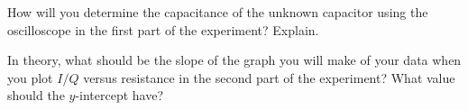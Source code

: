 \documentclass[addpoints]{physlabs}
\date{\today}
\begin{document}
\maketitle

\begin{prelab}

    \filbreak
    \question[1] How will you determine the capacitance of the unknown capacitor using the oscilloscope in the first part of the experiment? Explain.
    \begin{solution}[7cm]
        
    \end{solution}

    \filbreak
    \question[1] In theory, what should be the slope of the graph you will make of your data when you plot $I/Q$ versus resistance in the second part of the experiment? What value should the $y$-intercept have?
    \begin{solution}[7cm]
        
    \end{solution}
\end{prelab}
\end{document}
